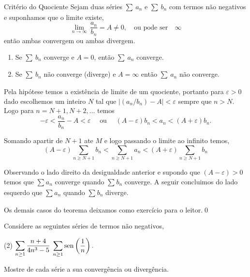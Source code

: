 \begin{theoc}{Crit\'{e}rio do Quociente}{}
Sejam duas s\'{e}ries $\sum_{}\,a_{n}$ e
$\sum_{}\,b_{n}$ com termos n\~{a}o negativos e suponhamos
que o limite existe,
\begin{equation*}
\lim_{n\to\infty}\,\frac{a_n}{b_n}=A\neq 0,\quad \text{ou pode ser}\quad \infty
\end{equation*}
ent\~{a}o ambas convergem ou ambas divergem.
\begin{enumerate}[label=\rm{(\alph*)},leftmargin=4em,ref=\rm{(\alph*)}]
\item Se $\sum_{}\,b_{n}$ converge e $A=0$, ent\~{a}o $\sum_{}\,a_{n}$  converge.
\item Se $\sum_{}\,b_{n}$ n\~{a}o converge (diverge) e $A=\infty$ ent\~{a}o $\sum_{}\,a_{n}$ n\~{a}o converge.
\end{enumerate}
\end{theoc}

\prova  Pela hip\'{o}tese temos a exist\^{e}ncia de  limite de um quociente,
portanto para $\varepsilon>0$ dado escolhemos um inteiro $N$ tal que
$|(a_n/b_n)-A|<\varepsilon$ sempre que $n>N$. Logo para $n=N+1,
N+2,\ldots$ temos
\begin{equation*}
    -\varepsilon<\frac{a_n}{b_n}-A<\varepsilon\quad \text{ ou
    }\quad (A-\varepsilon)b_n<a_n<(A+\varepsilon)b_n.
\end{equation*}

Somando apartir de $N+1$ ate $M$ e logo passando o limite ao
infinito temos,
\begin{equation*}
    (A-\varepsilon)\sum_{n\ge N+1}b_n<\sum_{n\ge N+1}a_n<(A+\varepsilon)\sum_{n\ge N+1}b_n
\end{equation*}

Observando o lado direito da desigualdade anterior e supondo que
$(A-\varepsilon)>0$ temos que $\sum_{}a_{n}$ converge
quando $\sum_{}b_{n}$ converge. A seguir concluimos do
lado esquerdo que $\sum_{}a_{n}$ quando $\sum_{}b_{n}$ diverge.

Os demais casos do teorema deixamos como exercício para o leitor.\qed

\begin{exer}
Considere as seguintes s\'{e}ries de termos n\~{a}o negativos,
\begin{tasks}[label=(\alph*),item-indent=6em,label-width=4ex,ref=(\alph*)](2)
 \task \(\displaystyle\sum_{n\ge 1}\frac{n+4}{4n^3-5}\)
 \task \(\displaystyle\sum_{n\ge 1}\operatorname{sen}\left(\frac{1}{n}\right).\)
\end{tasks}
Mostre de cada s\'{e}rie a sua converg\^{e}ncia ou diverg\^{e}ncia.
\end{exer}

